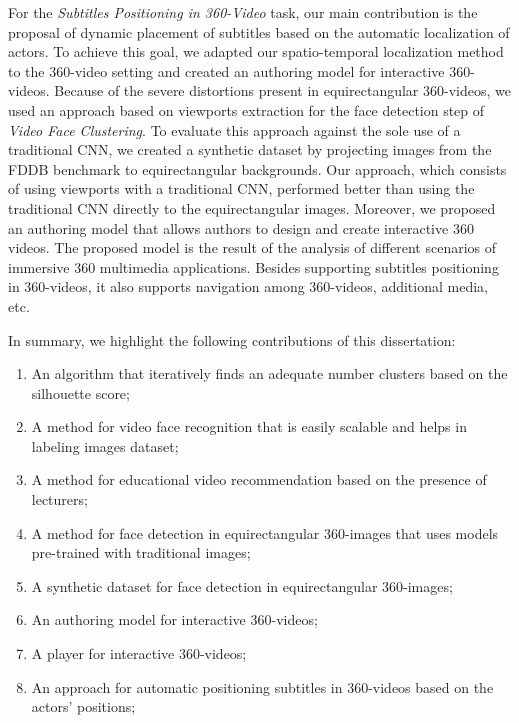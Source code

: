 For the \emph{Subtitles Positioning in 360-Video} task, our main contribution is the proposal of dynamic placement of subtitles based on the automatic localization of actors. To achieve this goal, we adapted our spatio-temporal localization method to the 360-video setting and created an authoring model for interactive 360-videos. Because of the severe distortions present in equirectangular 360-videos, we used an approach based on viewports extraction for the face detection step of \emph{Video Face Clustering}. To evaluate this approach against the sole use of a traditional CNN, we created a synthetic dataset by projecting images from the FDDB benchmark to equirectangular backgrounds. Our approach, which consists of using viewports with a traditional CNN, performed better than using the traditional CNN directly to the equirectangular images. Moreover, we proposed an authoring model that allows authors to design and create interactive 360 videos. The proposed model is the result of the analysis of different scenarios of immersive 360 multimedia applications. Besides supporting subtitles positioning in 360-videos, it also supports navigation among 360-videos, additional media, etc. 

In summary, we highlight the following contributions of this dissertation:
\begin{enumerate}
    \item An algorithm that iteratively finds an adequate number clusters based on the silhouette score;
    \item A method for video face recognition that is easily scalable and helps in labeling images dataset;
    \item A method for educational video recommendation based on the presence of lecturers;
    \item A method for face detection in equirectangular 360-images that uses models pre-trained with traditional images;
    \item A synthetic dataset for face detection in equirectangular 360-images;
    \item An authoring model for interactive 360-videos;
    \item A player for interactive 360-videos;
    \item An approach for automatic positioning subtitles in 360-videos based on the actors' positions;
\end{enumerate}

